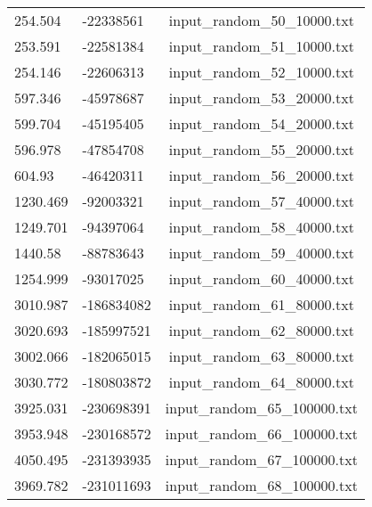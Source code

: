 \begin{longtable}[hb]{|l|l|c|}
    254.504 & -22338561 & input\_random\_50\_10000.txt \\
    253.591 & -22581384 & input\_random\_51\_10000.txt \\
    254.146 & -22606313 & input\_random\_52\_10000.txt \\
    597.346 & -45978687 & input\_random\_53\_20000.txt \\
    599.704 & -45195405 & input\_random\_54\_20000.txt \\
    596.978 & -47854708 & input\_random\_55\_20000.txt \\
    604.93 & -46420311 & input\_random\_56\_20000.txt \\
    1230.469 & -92003321 & input\_random\_57\_40000.txt \\
    1249.701 & -94397064 & input\_random\_58\_40000.txt \\
    1440.58 & -88783643 & input\_random\_59\_40000.txt \\
    1254.999 & -93017025 & input\_random\_60\_40000.txt \\
    3010.987 & -186834082 & input\_random\_61\_80000.txt \\
    3020.693 & -185997521 & input\_random\_62\_80000.txt \\
    3002.066 & -182065015 & input\_random\_63\_80000.txt \\
    3030.772 & -180803872 & input\_random\_64\_80000.txt \\
    3925.031 & -230698391 & input\_random\_65\_100000.txt \\
    3953.948 & -230168572 & input\_random\_66\_100000.txt \\
    4050.495 & -231393935 & input\_random\_67\_100000.txt \\
    3969.782 & -231011693 & input\_random\_68\_100000.txt \\
    \hline
\end{longtable}